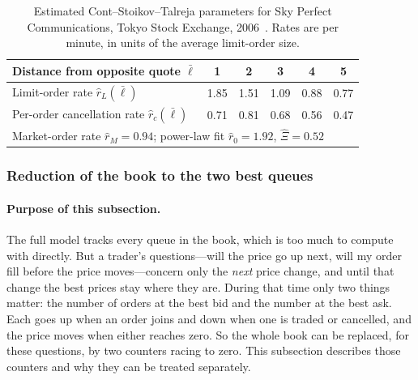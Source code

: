 \begin{table}[!htbp]
\centering\small
\caption{Estimated Cont--Stoikov--Talreja parameters for Sky Perfect Communications, Tokyo Stock
Exchange, 2006~\citep{cst2010}. Rates are per minute, in units of the average limit-order size.}
\label{tab:cst-est}
\begin{tabular}{lccccc}
\toprule
Distance from opposite quote $\bar\ell$ & 1 & 2 & 3 & 4 & 5 \\
\midrule
Limit-order rate $\widehat{r}_L(\bar\ell)$ & 1.85 & 1.51 & 1.09 & 0.88 & 0.77 \\
Per-order cancellation rate $\widehat{r}_c(\bar\ell)$ & 0.71 & 0.81 & 0.68 & 0.56 & 0.47 \\
\midrule
\multicolumn{6}{l}{Market-order rate $\widehat{r}_M = 0.94$; power-law fit $\widehat{r}_0 = 1.92$, $\widehat{\Xi} = 0.52$} \\
\bottomrule
\end{tabular}
\end{table}

\subsubsection{Reduction of the book to the two best queues}

\paragraph{Purpose of this subsection.} The full model tracks every queue in the book, which is too much
to compute with directly. But a trader's questions---will the price go up next, will my order fill
before the price moves---concern only the \emph{next} price change, and until that change the best
prices stay where they are. During that time only two things matter: the number of orders at the best
bid and the number at the best ask. Each goes up when an order joins and down when one is traded or
cancelled, and the price moves when either reaches zero. So the whole book can be replaced, for these
questions, by two counters racing to zero. This subsection describes those counters and why they can be
treated separately.

